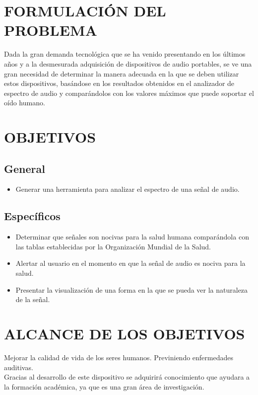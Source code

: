 \documentclass[10pt,graphicx,caption,rotating]{article}
\begin{document}
\section{FORMULACIÓN DEL PROBLEMA}
\noindent
Dada la gran demanda tecnológica que se ha venido presentando en los últimos años y a la desmesurada adquisición de dispositivos de audio portables, se ve una gran necesidad de determinar la manera adecuada en la que se deben utilizar estos dispositivos, basándose en los resultados obtenidos en el analizador de espectro de audio y comparándolos con los valores máximos que puede soportar el oído humano.

\section{OBJETIVOS}
\subsection{General}
\begin{itemize}
 \item Generar una herramienta para analizar el espectro de una señal de audio.
\end{itemize}

\subsection{Específicos}
\begin{itemize}
 \item Determinar que señales son nocivas para la salud humana comparándola con las tablas establecidas por la Organización Mundial de la Salud.
 \item Alertar al usuario en el momento en que la señal de audio es nociva para la salud.
 \item Presentar la visualización de una forma en la que se pueda ver la naturaleza de la señal.
\end{itemize}

\section{ALCANCE DE LOS OBJETIVOS}
\noindent
Mejorar la calidad de vida de los seres humanos. Previniendo enfermedades auditivas.\\
Gracias al desarrollo de este dispositivo se adquirirá conocimiento que ayudara a la formación académica, ya que es una gran área de investigación.
\end{document}
